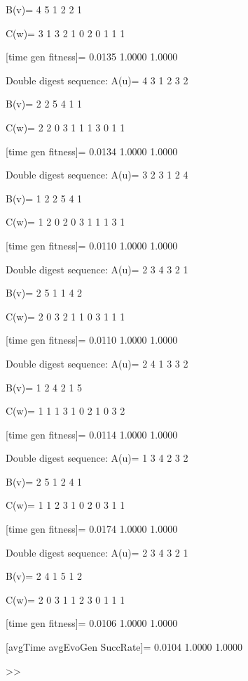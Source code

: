 B(v)=
     4     5     1     2     2     1

C(w)=
     3     1     3     2     1     0     2     0     1     1     1

[time gen fitness]=
    0.0135    1.0000    1.0000

Double digest sequence:
A(u)=
     4     3     1     2     3     2

B(v)=
     2     2     5     4     1     1

C(w)=
     2     2     0     3     1     1     1     3     0     1     1

[time gen fitness]=
    0.0134    1.0000    1.0000

Double digest sequence:
A(u)=
     3     2     3     1     2     4

B(v)=
     1     2     2     5     4     1

C(w)=
     1     2     0     2     0     3     1     1     1     3     1

[time gen fitness]=
    0.0110    1.0000    1.0000

Double digest sequence:
A(u)=
     2     3     4     3     2     1

B(v)=
     2     5     1     1     4     2

C(w)=
     2     0     3     2     1     1     0     3     1     1     1

[time gen fitness]=
    0.0110    1.0000    1.0000

Double digest sequence:
A(u)=
     2     4     1     3     3     2

B(v)=
     1     2     4     2     1     5

C(w)=
     1     1     1     3     1     0     2     1     0     3     2

[time gen fitness]=
    0.0114    1.0000    1.0000

Double digest sequence:
A(u)=
     1     3     4     2     3     2

B(v)=
     2     5     1     2     4     1

C(w)=
     1     1     2     3     1     0     2     0     3     1     1

[time gen fitness]=
    0.0174    1.0000    1.0000

Double digest sequence:
A(u)=
     2     3     4     3     2     1

B(v)=
     2     4     1     5     1     2

C(w)=
     2     0     3     1     1     2     3     0     1     1     1

[time gen fitness]=
    0.0106    1.0000    1.0000

[avgTime  avgEvoGen  SuccRate]=
    0.0104    1.0000    1.0000

>> 